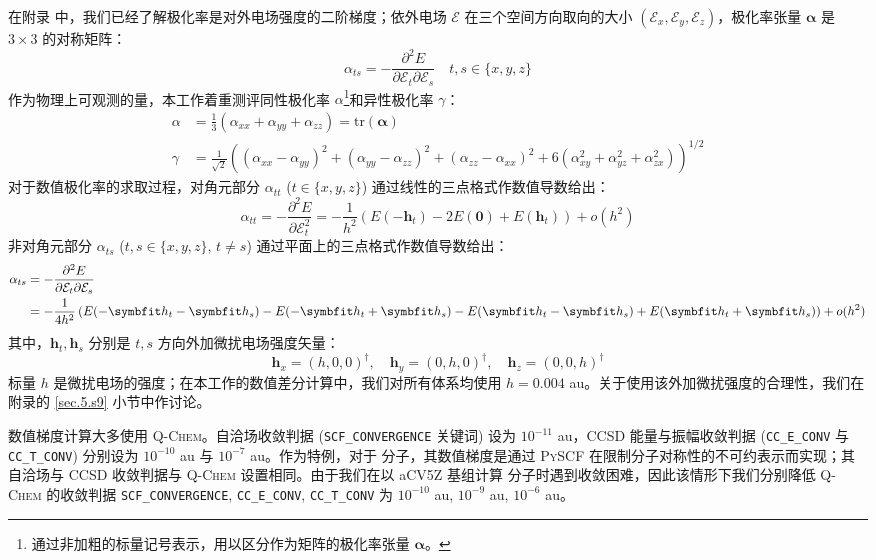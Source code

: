 在附录  中，我们已经了解极化率是对外电场强度的二阶梯度；依外电场 $\pmb{\mathcal{E}}$ 在三个空间方向取向的大小 $(\mathcal{E}_x, \mathcal{E}_y, \mathcal{E}_z)$，极化率张量 $\bm{\alpha}$ 是 $3 \times 3$ 的对称矩阵：
\begin{equation}
    \alpha_{ts} = - \frac{\partial^2 E}{\partial \mathcal{E}_t \partial \mathcal{E}_s} \quad t, s \in \{ x, y, z \}
\end{equation}
作为物理上可观测的量，本工作着重测评同性极化率 $\alpha$\footnote{通过非加粗的标量记号表示，用以区分作为矩阵的极化率张量 $\bm{\alpha}$。}和异性极化率 $\gamma$：
\begin{align}
    \alpha &= \frac{1}{3} \left( \alpha_{xx} + \alpha_{yy} + \alpha_{zz} \right) = \mathrm{tr} (\bm{\alpha}) \\
    \gamma &= \frac{1}{\sqrt{2}} \left( (\alpha_{xx} - \alpha_{yy})^2 + (\alpha_{yy} - \alpha_{zz})^2 + (\alpha_{zz} - \alpha_{xx})^2 + 6 (\alpha_{xy}^2 + \alpha_{yz}^2 + \alpha_{zx}^2) \right)^{1/2}
\end{align}
对于数值极化率的求取过程，对角元部分 $\alpha_{tt}$ ($t \in \{ x, y, z \}$) 通过线性的三点格式作数值导数给出：
\begin{equation}
    \label{eq.pol-findiff-alpha-def}
    \alpha_{tt} = - \frac{\partial^2 E}{\partial \mathcal{E}_t^2} = - \frac{1}{h^2} \left( E(- \bm{h}_t) - 2 E(\bm{0}) + E(\bm{h}_t) \right) + o(h^2)
\end{equation}
非对角元部分 $\alpha_{ts}$ ($t, s \in \{ x, y, z \}, \, t \neq s$) 通过平面上的三点格式作数值导数给出：
\begin{align}
    \label{eq.pol-findiff-gamma-def}
    \alpha_{ts} &= - \frac{\partial^2 E}{\partial \mathcal{E}_t \partial \mathcal{E}_s} \notag\\
    &= - \frac{1}{4h^2} \left( E(- \bm{h}_t - \bm{h}_s) - E(- \bm{h}_t + \bm{h}_s) - E(\bm{h}_t - \bm{h}_s) + E(\bm{h}_t + \bm{h}_s) \right) + o(h^2)
\end{align}
其中，$\bm{h}_t, \bm{h}_s$ 分别是 $t, s$ 方向外加微扰电场强度矢量：
\begin{equation*}
    \bm{h}_x = (h, 0, 0)^\dagger, \quad \bm{h}_y = (0, h, 0)^\dagger, \quad \bm{h}_z = (0, 0, h)^\dagger
\end{equation*}
标量 $h$ 是微扰电场的强度；在本工作的数值差分计算中，我们对所有体系均使用 $h = 0.004$ au。关于使用该外加微扰强度的合理性，我们在附录的 \ref{sec.5.s9} 小节中作讨论。

数值梯度计算大多使用 \textsc{Q-Chem}。自洽场收敛判据 (\texttt{SCF\_CONVERGENCE} 关键词) 设为 $10^{-11}$ au，CCSD 能量与振幅收敛判据 (\texttt{CC\_E\_CONV} 与 \texttt{CC\_T\_CONV}) 分别设为 $10^{-10}$ au 与 $10^{-7}$ au。作为特例，对于  分子，其数值梯度是通过 \textsc{PySCF} 在限制分子对称性的不可约表示而实现；其自洽场与 CCSD 收敛判据与 \textsc{Q-Chem} 设置相同。由于我们在以 aCV5Z 基组计算  分子时遇到收敛困难，因此该情形下我们分别降低 \textsc{Q-Chem} 的收敛判据 \texttt{SCF\_CONVERGENCE}, \texttt{CC\_E\_CONV}, \texttt{CC\_T\_CONV} 为 $10^{-10}$ au, $10^{-9}$ au, $10^{-6}$ au。

